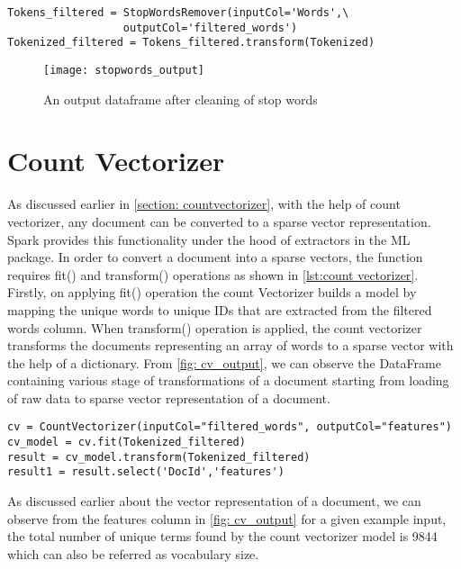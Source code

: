 \begin{lstlisting}[style=Java,float=htb,caption={Python code for removal of stop words},label={lst:stopwords}]
Tokens_filtered = StopWordsRemover(inputCol='Words',\
				  outputCol='filtered_words')
Tokenized_filtered = Tokens_filtered.transform(Tokenized)
\end{lstlisting}

\begin{figure}[htbp]
	\centering
		\texttt{[image: stopwords\_output]}
	\caption{An output dataframe after cleaning of stop words }
	\label{fig: stopwords_output}
\end{figure}

\section{Count Vectorizer}
As discussed earlier in \ref{section: countvectorizer}, with the help of count vectorizer, any document can be converted to a sparse vector representation. Spark provides this functionality under the hood of extractors in the ML package. In order to convert a document into a sparse vectors, the function requires fit() and transform() operations as shown in \ref{lst:count vectorizer}. Firstly, on applying fit() operation the count Vectorizer builds a model by mapping the unique words to unique IDs that are extracted from the filtered words column. When transform() operation is applied, the count vectorizer transforms the documents representing an array of words to a sparse vector with the help of a dictionary. From \ref{fig: cv_output}, we can observe the DataFrame containing various stage of transformations of a document starting from loading of raw data to sparse vector representation of a document. 

\begin{lstlisting}[style=Java,float=htb,caption={Python code to perform count vectorization},label={lst:count vectorizer}]
cv = CountVectorizer(inputCol="filtered_words", outputCol="features")
cv_model = cv.fit(Tokenized_filtered)     
result = cv_model.transform(Tokenized_filtered)
result1 = result.select('DocId','features')
\end{lstlisting}

\par As discussed earlier about the vector representation of a document, we can observe from the features column in \ref{fig: cv_output} for a given example input, the total number of unique terms found by the count vectorizer model is 9844 which can also be referred as vocabulary size.

